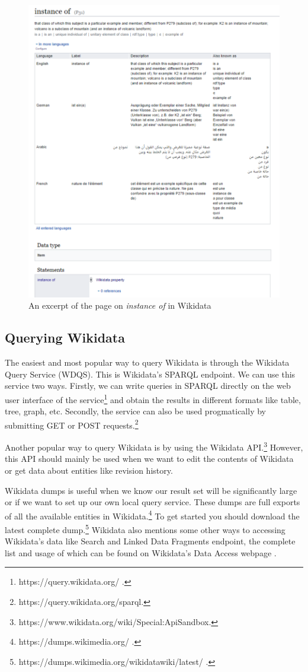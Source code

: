 \begin{figure}[h]
  \centering
  \includegraphics[width=0.75 \linewidth]{images/instance_of.pdf}
  \caption{An excerpt of the page on \textit{instance of} in Wikidata}
  \label{fig:figure 5}
\end{figure}

\subsection{Querying Wikidata}

The easiest and most popular way to query Wikidata is through the Wikidata Query Service (WDQS). This is Wikidata's SPARQL endpoint. We can use this service two ways. Firstly, we can write queries in SPARQL directly on the web user interface of the service\footnote{https://query.wikidata.org/ .} and obtain the results in different formats like table, tree, graph, etc. Secondly, the service can also be used progmatically by submitting GET or POST requests.\footnote{https://query.wikidata.org/sparql.}

Another popular way to query Wikidata is by using the Wikidata API.\footnote{https://www.wikidata.org/wiki/Special:ApiSandbox.} However, this API should mainly be used when we want to edit the contents of Wikidata or get data about entities like revision history.

Wikidata dumps is useful when we know our result set will be significantly large or if we want to set up our own local query service. These dumps are full exports of all the available entities in Wikidata.\footnote{https://dumps.wikimedia.org/ .} To get started you should download the latest complete dump.\footnote{https://dumps.wikimedia.org/wikidatawiki/latest/ .} Wikidata also mentions some other ways to accessing Wikidata's data like Search and Linked Data Fragments endpoint, the complete list and usage of which can be found on Wikidata's Data Access webpage \cite{ Wikidata2022}.


